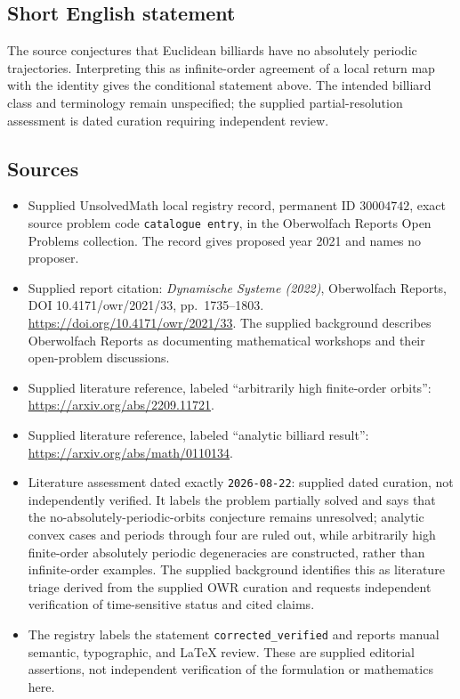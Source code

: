\documentclass[11pt]{article}
\begin{document}
\subsection{Short English statement}
The source conjectures that Euclidean billiards have no absolutely periodic trajectories. Interpreting this as infinite-order agreement of a local return map with the identity gives the conditional statement above. The intended billiard class and terminology remain unspecified; the supplied partial-resolution assessment is dated curation requiring independent review.
\subsection{Sources}
\begin{itemize}
\item Supplied UnsolvedMath local registry record, permanent ID \(30004742\), exact source problem code \texttt{catalogue entry}, in the Oberwolfach Reports Open Problems collection. The record gives proposed year 2021 and names no proposer.
\item Supplied report citation: \emph{Dynamische Systeme (2022)}, Oberwolfach Reports, DOI 10.4171/owr/2021/33, pp.\ 1735--1803. \url{https://doi.org/10.4171/owr/2021/33}. The supplied background describes Oberwolfach Reports as documenting mathematical workshops and their open-problem discussions.
\item Supplied literature reference, labeled ``arbitrarily high finite-order orbits'': \url{https://arxiv.org/abs/2209.11721}.
\item Supplied literature reference, labeled ``analytic billiard result'': \url{https://arxiv.org/abs/math/0110134}.
\item Literature assessment dated exactly \texttt{2026-08-22}: supplied dated curation, not independently verified. It labels the problem partially solved and says that the no-absolutely-periodic-orbits conjecture remains unresolved; analytic convex cases and periods through four are ruled out, while arbitrarily high finite-order absolutely periodic degeneracies are constructed, rather than infinite-order examples. The supplied background identifies this as literature triage derived from the supplied OWR curation and requests independent verification of time-sensitive status and cited claims.
\item The registry labels the statement \texttt{corrected\_verified} and reports manual semantic, typographic, and LaTeX review. These are supplied editorial assertions, not independent verification of the formulation or mathematics here.
\end{itemize}
\end{document}
